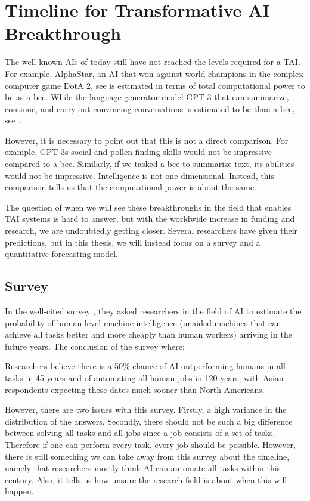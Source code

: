 \documentclass[12pt,A4]{report}
\theoremstyle{definition}
\begin{document}
\section{Timeline for Transformative AI Breakthrough}
The well-known AIs of today still have not reached the levels required for a TAI. For example, AlphaStar, an AI that won against world champions in the complex computer game DotA 2, see \citet{ALphaStar} is estimated in terms of total computational power to be  as a bee. While the language generator model GPT-3 that can summarize, continue, and carry out convincing conversations is estimated to be  than a bee, see \citet{Ajeya}.

However, it is necessary to point out that this is not a direct comparison. For example, GPT-3s social and pollen-finding skills would not be impressive compared to a bee. Similarly, if we tasked a bee to summarize text, its abilities would not be impressive. Intelligence is not one-dimensional. Instead, this comparison tells us that the computational power is about the same. 

The question of when we will see these breakthroughs in the field that enables TAI systems is hard to answer, but with the worldwide increase in funding and research, we are undoubtedly getting closer. Several researchers have given their predictions, but in this thesis, we will instead focus on a survey and a quantitative forecasting model.

\subsection{Survey}
In the well-cited survey \citet{Grace}, they asked researchers in the field of AI to estimate the probability of human-level machine intelligence (unaided machines that can achieve all tasks better and more cheaply than human workers) arriving in the future years. The conclusion of the survey where:
\begin{displayquote}
Researchers believe there is a 50\% chance of AI outperforming humans in all tasks in 45 years and of automating all human jobs in 120 years, with Asian respondents expecting these dates much sooner than North Americans.
\end{displayquote}
However, there are two issues with this survey. Firstly, a high variance in the distribution of the answers. Secondly, there should not be such a big difference between solving all tasks and all jobs since a job consists of a set of tasks. Therefore if one can perform every task, every job should be possible. However, there is still something we can take away from this survey about the timeline, namely that researchers mostly think AI can automate all tasks within this century. Also, it tells us how unsure the research field is about when this will happen. 
\end{document}

